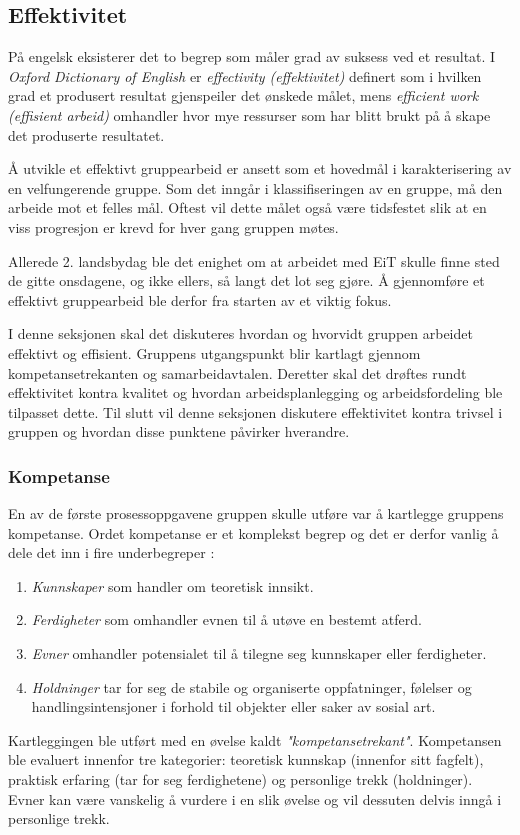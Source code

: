 \subsection{Effektivitet}
På engelsk eksisterer det to begrep som måler grad av suksess ved et resultat. 
I \textit{Oxford Dictionary of English} er \textit{effectivity (effektivitet)} definert som i hvilken grad et produsert resultat gjenspeiler det ønskede målet, mens \textit{efficient work (effisient arbeid)} omhandler hvor mye ressurser som har blitt brukt på å skape det produserte resultatet. 

Å utvikle et effektivt gruppearbeid er ansett som et hovedmål i karakterisering av en velfungerende gruppe. 
Som det inngår i klassifiseringen av en gruppe, må den arbeide mot et felles mål. 
Oftest vil dette målet også være tidsfestet slik at en viss progresjon er krevd for hver gang gruppen møtes.

Allerede 2. landsbydag ble det enighet om at arbeidet med EiT skulle finne sted de gitte onsdagene, og ikke ellers, så langt det lot seg gjøre. 
Å gjennomføre et effektivt gruppearbeid ble derfor fra starten av et viktig fokus. 

I denne seksjonen skal det diskuteres hvordan og hvorvidt gruppen arbeidet effektivt og effisient.
Gruppens utgangspunkt blir kartlagt gjennom kompetansetrekanten og samarbeidavtalen.
Deretter skal det drøftes rundt effektivitet kontra kvalitet og hvordan arbeidsplanlegging og arbeidsfordeling ble tilpasset dette.
Til slutt vil denne seksjonen diskutere effektivitet kontra trivsel i gruppen og hvordan disse punktene påvirker hverandre. 

\subsubsection{Kompetanse}
En av de første prosessoppgavene gruppen skulle utføre var å kartlegge gruppens kompetanse.
Ordet kompetanse er et komplekst begrep og det er derfor vanlig å dele det inn i fire underbegreper \cite{orgorg}:
\begin{enumerate}
\item \textit{Kunnskaper} som handler om teoretisk innsikt.
\item \textit{Ferdigheter} som omhandler evnen til å utøve en bestemt atferd.
\item \textit{Evner} omhandler potensialet til å tilegne seg kunnskaper eller ferdigheter.
\item \textit{Holdninger} tar for seg de stabile og organiserte oppfatninger, følelser og handlingsintensjoner i forhold til objekter eller saker av sosial art.
\end{enumerate}
Kartleggingen ble utført med en øvelse kaldt \emph{"kompetansetrekant"}.
Kompetansen ble evaluert innenfor tre kategorier: teoretisk kunnskap (innenfor sitt fagfelt), praktisk erfaring (tar for seg ferdighetene) og personlige trekk (holdninger).
Evner kan være vanskelig å vurdere i en slik øvelse og vil dessuten delvis inngå i personlige trekk.

